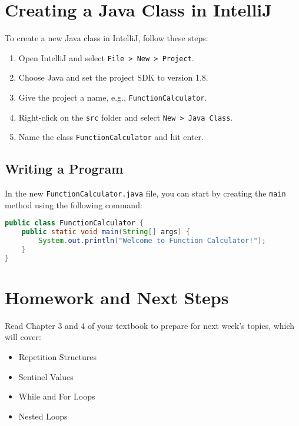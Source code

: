 \documentclass{article}
\begin{document}
\section{Creating a Java Class in IntelliJ}
To create a new Java class in IntelliJ, follow these steps:
\begin{enumerate}
    \item Open IntelliJ and select \texttt{File > New > Project}.
    \item Choose Java and set the project SDK to version 1.8.
    \item Give the project a name, e.g., \texttt{FunctionCalculator}.
    \item Right-click on the \texttt{src} folder and select \texttt{New > Java Class}.
    \item Name the class \texttt{FunctionCalculator} and hit enter.
\end{enumerate}

\subsection{Writing a Program}
In the new \texttt{FunctionCalculator.java} file, you can start by creating the \texttt{main} method using the following command:
\begin{lstlisting}[language=Java]
public class FunctionCalculator {
    public static void main(String[] args) {
        System.out.println("Welcome to Function Calculator!");
    }
}
\end{lstlisting}

\section{Homework and Next Steps}
Read Chapter 3 and 4 of your textbook to prepare for next week's topics, which will cover:
\begin{itemize}
    \item Repetition Structures
    \item Sentinel Values
    \item While and For Loops
    \item Nested Loops
\end{itemize}
\end{document}

